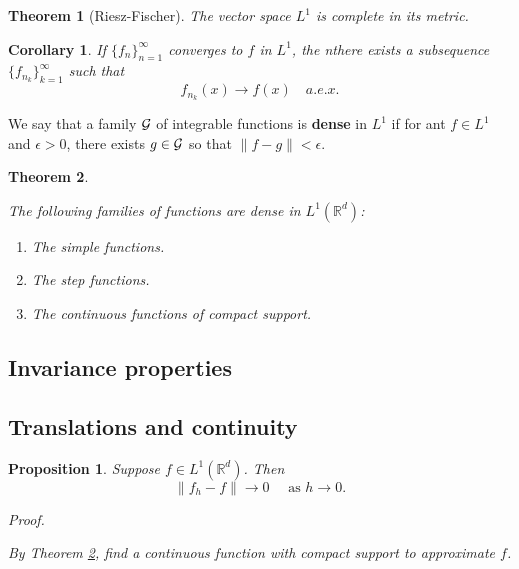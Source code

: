 \documentclass[
]{book}
\providecommand{\tightlist}{%
  \setlength{\itemsep}{0pt}\setlength{\parskip}{0pt}}
\newtheorem{theorem}{Theorem}[chapter]
\newtheorem{corollary}{Corollary}[chapter]
\newtheorem{proposition}{Proposition}[chapter]
\theoremstyle{definition}
\theoremstyle{definition}
\theoremstyle{definition}
\theoremstyle{definition}
\theoremstyle{remark}
\begin{document}
\begin{theorem}[Riesz-Fischer]
\protect\hypertarget{thm:rf}{}\label{thm:rf}The vector space \(L^1\) is complete in its metric.
\end{theorem}

\begin{corollary}
If \(\{f_n\}_{n=1}^\infty\) converges to \(f\) in \(L^1\), the nthere exists a subsequence \(\{f_{n_k}\}_{k=1}^\infty\) such that
\[
f_{n_k}(x)\to f(x)\quad a.e. x.
\]
\end{corollary}

We say that a family \(\cal G\) of integrable functions is \textbf{dense} in \(L^1\) if for ant \(f\in L^1\) and \(\epsilon>0\), there exists \(g\in\cal G\) so that \(\|f-g\|<\epsilon\).

\begin{theorem}
\protect\hypertarget{thm:d}{}\label{thm:d}

The following families of functions are dense in \(L^1(\mathbb{R}^d)\):

\begin{enumerate}
\def\labelenumi{\arabic{enumi}.}
\tightlist
\item
  The simple functions.
\item
  The step functions.
\item
  The continuous functions of compact support.
\end{enumerate}

\end{theorem}

\subsection{Invariance properties}\label{invariance-properties}

\subsection{Translations and continuity}\label{translations-and-continuity}

\begin{proposition}
\leavevmode

Suppose \(f\in L^1(\mathbb{R}^d)\). Then
\[
\|f_h-f\|\to 0\quad \text{ as }h\to 0.
\]

\emph{Proof.}

By Theorem \ref{thm:d}, find a continuous function with compact support to approximate \(f\).

\end{proposition}
\end{document}
